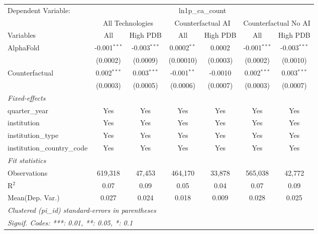\begingroup
\centering
\begin{tabular}{lcccccc}
   \tabularnewline \midrule \midrule
   Dependent Variable: & \multicolumn{6}{c}{ln1p\_ca\_count}\\
 & \multicolumn{2}{c}{All Technologies} & \multicolumn{2}{c}{Counterfactual AI} & \multicolumn{2}{c}{Counterfactual No AI} \\
\cmidrule(lr){1-1}\cmidrule(lr){2-3} \cmidrule(lr){4-5} \cmidrule(lr){6-7}
Variables & \multicolumn{1}{c}{All} & \multicolumn{1}{c}{High PDB} & \multicolumn{1}{c}{All} & \multicolumn{1}{c}{High PDB} & \multicolumn{1}{c}{All} & \multicolumn{1}{c}{High PDB} \\
\cmidrule(lr){1-1}\cmidrule(lr){2-2} \cmidrule(lr){3-3} \cmidrule(lr){4-4} \cmidrule(lr){5-5} \cmidrule(lr){6-6} \cmidrule(lr){7-7}
   AlphaFold                    & -0.001$^{***}$ & -0.003$^{***}$ & 0.0002$^{**}$ & 0.0002   & -0.001$^{***}$ & -0.003$^{***}$\\   
                                & (0.0002)       & (0.0009)       & (0.00010)     & (0.0003) & (0.0002)       & (0.0010)\\   
   Counterfactual               & 0.002$^{***}$  & 0.003$^{***}$  & -0.001$^{**}$ & -0.0010  & 0.002$^{***}$  & 0.003$^{***}$\\   
                                & (0.0003)       & (0.0005)       & (0.0006)      & (0.0007) & (0.0003)       & (0.0007)\\   
   \midrule
   \emph{Fixed-effects}\\
   quarter\_year                & Yes            & Yes            & Yes           & Yes      & Yes            & Yes\\  
   institution                  & Yes            & Yes            & Yes           & Yes      & Yes            & Yes\\  
   institution\_type            & Yes            & Yes            & Yes           & Yes      & Yes            & Yes\\  
   institution\_country\_code   & Yes            & Yes            & Yes           & Yes      & Yes            & Yes\\  
   \midrule
   \emph{Fit statistics}\\
   Observations                 & 619,318        & 47,453         & 464,170       & 33,878   & 565,038        & 42,772\\  
   R$^2$                        & 0.07           & 0.09           & 0.05          & 0.04     & 0.07           & 0.09\\  
Mean(Dep. Var.) & 0.027 & 0.024 & 0.018 & 0.009 & 0.028 & 0.025 \\
   \midrule \midrule
   \multicolumn{7}{l}{\emph{Clustered (pi\_id) standard-errors in parentheses}}\\
   \multicolumn{7}{l}{\emph{Signif. Codes: ***: 0.01, **: 0.05, *: 0.1}}\\
\end{tabular}
\par\endgroup
